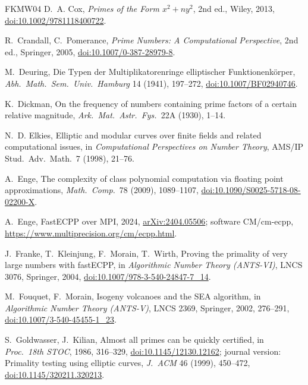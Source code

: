 \documentclass[11pt]{amsart}
\theoremstyle{plain}
\theoremstyle{definition}
\theoremstyle{remark}
\begin{document}
\begin{thebibliography}{FKMW04}
 D.~A. Cox, \emph{Primes of the Form $x^2+ny^2$}, 2nd ed., Wiley, 2013, \href{https://doi.org/10.1002/9781118400722}{doi:10.1002/9781118400722}.

 R.~Crandall, C.~Pomerance, \emph{Prime Numbers: A Computational Perspective}, 2nd
ed., Springer, 2005, \href{https://doi.org/10.1007/0-387-28979-8}{doi:10.1007/0-387-28979-8}.

 M.~Deuring, Die Typen der Multiplikatorenringe elliptischer
Funktionenk\"orper, \emph{Abh.\ Math.\ Sem.\ Univ.\ Hamburg} 14 (1941), 197--272, \href{https://doi.org/10.1007/BF02940746}{doi:10.1007/BF02940746}.

 K.~Dickman, On the frequency of numbers containing prime factors of a certain
relative magnitude, \emph{Ark.\ Mat.\ Astr.\ Fys.}\ 22A (1930), 1--14.

 N.~D. Elkies, Elliptic and modular curves over finite fields and related
computational issues, in \emph{Computational Perspectives on Number Theory}, AMS/IP Stud.\ Adv.\ Math.\
7 (1998), 21--76.

 A.~Enge, The complexity of class polynomial computation via floating point
approximations, \emph{Math.\ Comp.}\ 78 (2009), 1089--1107, \href{https://doi.org/10.1090/S0025-5718-08-02200-X}{doi:10.1090/S0025-5718-08-02200-X}.

 A.~Enge, FastECPP over MPI, 2024, \href{https://arxiv.org/abs/2404.05506}
{arXiv:2404.05506}; software CM/cm-ecpp, \url{https://www.multiprecision.org/cm/ecpp.html}.

 J.~Franke, T.~Kleinjung, F.~Morain, T.~Wirth, Proving the primality of very
large numbers with fastECPP, in \emph{Algorithmic Number Theory (ANTS-VI)}, LNCS 3076, Springer, 2004, \href{https://doi.org/10.1007/978-3-540-24847-7_14}{doi:10.1007/978-3-540-24847-7\_14}.

 M.~Fouquet, F.~Morain, Isogeny volcanoes and the SEA algorithm, in
\emph{Algorithmic Number Theory (ANTS-V)}, LNCS 2369, Springer, 2002, 276--291, \href{https://doi.org/10.1007/3-540-45455-1_23}{doi:10.1007/3-540-45455-1\_23}.

 S.~Goldwasser, J.~Kilian, Almost all primes can be quickly certified, in
\emph{Proc.\ 18th STOC}, 1986, 316--329, \href{https://doi.org/10.1145/12130.12162}
{doi:10.1145/12130.12162}; journal version: Primality testing using elliptic curves,
\emph{J.~ACM} 46 (1999), 450--472, \href{https://doi.org/10.1145/320211.320213}
{doi:10.1145/320211.320213}.


\end{thebibliography}
\end{document}
